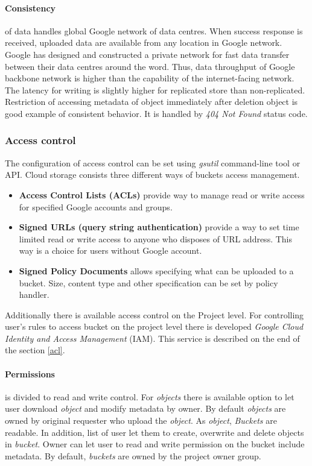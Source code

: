 \documentclass[a4paper,12pt,oneside]{report}
\begin{document}
	\paragraph{Consistency} of data handles global Google network of data centres. 
	When success response is received, uploaded data are available from any location
	in 
	Google network. Google has designed and constructed a private network 
	for fast data transfer between their data centres around the word. Thus, data
	throughput 
	of Google backbone network is higher than the capability of the 
	internet-facing network. The latency for writing is slightly higher for
	replicated store 
	than non-replicated. Restriction of accessing metadata of object immediately
	after deletion object is good example of consistent behavior.
	It is handled by \textit{404 Not Found} status code.
	
	
	\subsubsection{Access control}
	The configuration of access control can be set using \textit{gsutil}
	command-line tool 
	or API. Cloud storage consists three different ways of buckets access
	management.
	\begin{itemize}
		\item\textbf{Access Control Lists (ACLs)} provide way to manage read or write
		access for specified Google accounts and groups.
		\item\textbf{Signed URLs (query string authentication)} provide a way to set time 
		limited read or write access to anyone who disposes of URL address. This way is
		a choice for users without Google account.   
		\item\textbf{Signed Policy Documents} allows specifying what can be uploaded to
		a bucket. 
		Size, content type and other specification can be set by policy handler. 
	\end{itemize}
	Additionally there is available access control on the Project level. For controlling 
	user's rules 
	to access bucket on the project level there is developed   \textit{Google Cloud
		Identity and Access Management} (IAM). This service is described on 
	the end of the section \ref{acl}.
	
	\paragraph{Permissions} is  divided to read and write control.
	For \textit{objects} there is available option to let user download \textit{object} 
	and modify metadata by owner.
	By default \textit{objects} are owned by original requester who 
	upload the \textit{object}. As \textit{object}, \textit{Buckets} are readable.
	In addition, list of user let them to create, overwrite and delete objects 
	in \textit{bucket}. Owner can let user to read and write permission on the
	bucket include metadata. By default, \textit{buckets} are owned by the project 
	owner group.
	
\end{document}
